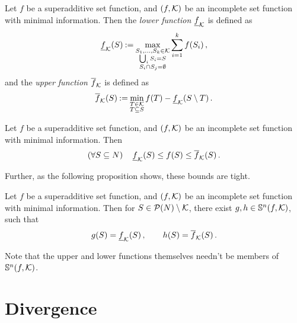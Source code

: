 \begin{defi}
  Let $ f $ be a superadditive set function, and $ \left( f, \mathcal{K} \right) $ be an incomplete set function with minimal information.
  Then the \emph{lower function} $ \underline{f}_{\mathcal{K}} $ is defined as \[
    \underline{f}_{\mathcal{K}}\!\left(S\right) \mathbin{:=} \max_{\substack{S_1, \dots, S_k \in \mathcal{K} \\ \bigcup_i S_i = S \\ S_i \cap S_j = \emptyset}} \sum_{i=1}^k f\!\left(S_i\right),
  \]
  and the \emph{upper function} $ \overline{f}_{\mathcal{K}} $ is defined as \[
    \overline{f}_{\mathcal{K}}\!\left(S\right) \mathbin{:=} \min_{\substack{T \in \mathcal{K} \\ T \subseteq S}} f\!\left(T\right) - \underline{f}_{\mathcal{K}}\!\left(S \setminus T\right).
  \]
\end{defi}

\begin{prop}[ ]
  Let $ f $ be a superadditive set function, and $ \left( f, \mathcal{K} \right) $ be an incomplete set function with minimal information.
  Then \[
    \left( \forall S \subseteq N \right)\quad \underline{f}_{\mathcal{K}}\!\left(S\right) \leq f\!\left(S\right) \leq \overline{f}_{\mathcal{K}}\!\left(S\right).
  \]
\end{prop}

Further, as the following proposition shows, these bounds are tight.

\begin{prop}[ ]
  Let $ f $ be a superadditive set function, and $ \left( f, \mathcal{K} \right) $ be an incomplete set function with minimal information.
  Then for $ S \in \mathcal{P}\!\left(N\right) \setminus \mathcal{K} $, there exist $ g,h \in \mathbb{S}^n\!\left(f, \mathcal{K}\right) $, such that \[
    g\!\left(S\right) = \underline{f}_{\mathcal{K}}\!\left(S\right), \qquad h\!\left(S\right) = \overline{f}_{\mathcal{K}}\!\left(S\right).
  \]
\end{prop}

Note that the upper and lower functions themselves needn't be members of $ \mathbb{S}^n\!\left(f, \mathcal{K}\right) $.

\section{Divergence}
\label{sec:divergence}

